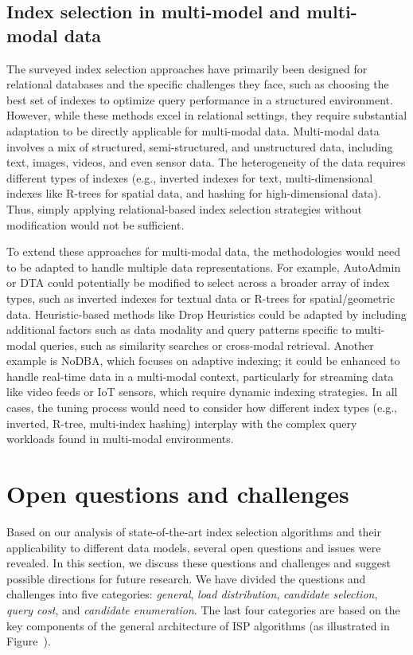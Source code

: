 \subsection{Index selection in multi-model and multi-modal data}

The surveyed index selection approaches have primarily been designed for relational databases and the specific challenges they face, such as choosing the best set of indexes to optimize query performance in a structured environment. However, while these methods excel in relational settings, they require substantial adaptation to be directly applicable for multi-modal data. Multi-modal data involves a mix of structured, semi-structured, and unstructured data, including text, images, videos, and even sensor data. The heterogeneity of the data requires different types of indexes (e.g., inverted indexes for text, multi-dimensional indexes like R-trees for spatial data, and hashing for high-dimensional data). Thus, simply applying relational-based index selection strategies without modification would not be sufficient.

To extend these approaches for multi-modal data, the methodologies would need to be adapted to handle multiple data representations. For example, AutoAdmin or DTA could potentially be modified to select across a broader array of index types, such as inverted indexes for textual data or R-trees for spatial/geometric data. Heuristic-based methods like Drop Heuristics could be adapted by including additional factors such as data modality and query patterns specific to multi-modal queries, such as similarity searches or cross-modal retrieval. Another example is NoDBA, which focuses on adaptive indexing; it could be enhanced to handle real-time data in a multi-modal context, particularly for streaming data like video feeds or IoT sensors, which require dynamic indexing strategies. In all cases, the tuning process would need to consider how different index types (e.g., inverted, R-tree, multi-index hashing) interplay with the complex query workloads found in multi-modal environments.

\section{Open questions and challenges}
Based on our analysis of state-of-the-art index selection algorithms and their applicability to different data models, several open questions and issues were revealed. In this section, we discuss these questions and challenges and suggest possible directions for future research. We have divided the questions and challenges into five categories: \textit{general}, \textit{load distribution}, \textit{candidate selection}, \textit{query cost}, and \textit{candidate enumeration}. The last four categories are based on the key components of the general architecture of ISP algorithms (as illustrated in Figure~).

